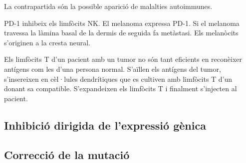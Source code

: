 La contrapartida són la possible aparició de malalties autoimmunes.

PD-1 inhibeix els limfòcits NK. El melanoma expressa PD-1. Si el
melanoma travessa la làmina basal de la dermis de seguida fa
metàstasi. Els melanòcits s'originen a la cresta neural.

Els limfòcits T d'un pacient amb un tumor no són tant eficients en
reconèixer antígens com les d'una persona normal. S'aïllen els
antígens del tumor, s'insereixen en cèl·lules dendrítiques que es
cultiven amb limfòcits T d'un donant sa compatible. S'expandeixen els
limfòcits T i finalment s'injecten al pacient.

\subsection{Inhibició dirigida de l'expressió gènica}
\label{sec:inhib-dirig-de}


\subsection{Correcció de la mutació}
\label{sec:correccio-de-la}

